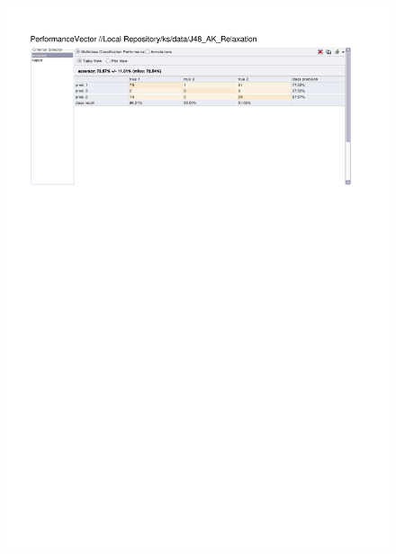 \begin{figure}[htp]
  \centerline{\includegraphics[trim=0 683 0 60,clip,width=16.09cm]{results/J48_A_Relaxation.pdf}} \caption{
} \label{J48_K_Relaxation}
\end{figure}

